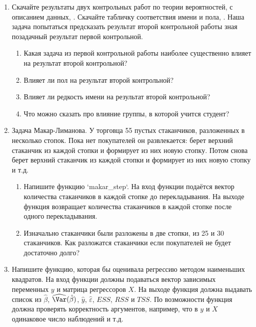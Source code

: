 \documentclass[pdftex,12pt,a4paper]{article}
\def \hb{\hat{\beta}}
\def \hy{\hat{y}}
\def \he{\hat{\varepsilon}}
\def \hVar{\widehat{\Var}}
\newcommand{\solution}[1]{ {\tiny #1} }
\begin{document}
\begin{enumerate}


\item Скачайте результаты двух контрольных работ по теории вероятностей, \url{} с описанием данных, \url{}. Скачайте табличку соответствия имени и пола, \url{}. Наша задача попытаться предсказать результат второй контрольной работы зная позадачный результат первой контрольной. 
\begin{enumerate}
\item Какая задача из первой контрольной работы наиболее существенно влияет на результат второй контрольной?
\item Влияет ли пол на результат второй контрольной?
\item Влияет ли редкость имени на результат второй контрольной?
\item Что можно сказать про влияние группы, в которой учится студент?
\end{enumerate}
\solution{}

\item Задача Макар-Лиманова. У торговца 55 пустых стаканчиков, разложенных в несколько стопок. Пока нет покупателей он развлекается: берет верхний стаканчик из каждой стопки и формирует из них новую стопку. Потом снова берет верхний стаканчик из каждой стопки и формирует из них новую стопку и т.д.
\begin{enumerate}
\item Напишите функцию `makar\_step`. На вход функции подаётся вектор количества стаканчиков в каждой стопке до перекладывания. На выходе функция возвращает количества стаканчиков в каждой стопке после одного перекладывания.
\item Изначально стаканчики были разложены в две стопки, из 25 и 30 стаканчиков. Как разложатся стаканчики если покупателей не будет достаточно долго?
\end{enumerate}
\solution{}

\item Напишите функцию, которая бы оценивала регрессию методом наименьших квадратов. На вход функции должны подаваться вектор зависимых переменных $y$ и матрица регрессоров $X$. На выходе функция должна выдавать список из $\hb$, $\hVar(\hb)$, $\hy$, $\he$, $ESS$, $RSS$ и $TSS$. По возможности функция должна проверять корректность аргументов, например, что в $y$ и $X$ одинаковое число наблюдений и т.д.
\solution{}


\end{enumerate}
\end{document}
